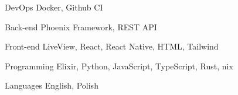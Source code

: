 

\begin{cvskills}

  \cvskill
    {DevOps} %
    {Docker, Github CI} %

  \cvskill
    {Back-end} %
    {Phoenix Framework, REST API} %

  \cvskill
    {Front-end} %
    {LiveView, React, React Native, HTML, Tailwind} %

  \cvskill
    {Programming} %
    {Elixir, Python, JavaScript, TypeScript, Rust, nix} %

  \cvskill
    {Languages} %
    {English, Polish} %

\end{cvskills}
